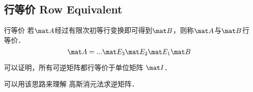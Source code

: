 
\subsection{行等价 Row Equivalent}
\begin{definition}{行等价}
若$\mat A$经过有限次初等行变换即可得到$\mat B$，则称$\mat A$与$\mat B$行等价．
\begin{equation}
\mat A= ... \mat E_3 \mat E_2 \mat E_1 \mat  B
\end{equation}
\end{definition}

可以证明，所有可逆矩阵都行等价于单位矩阵 $\mat I$．

可以用该思路来理解 高斯消元法求逆矩阵．
